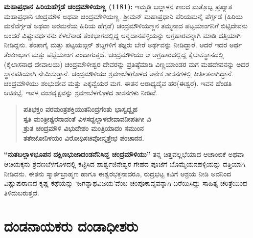 \textbf{ಮಹಾಪ್ರಧಾನ ಹಿರಿಯಹೆಗ್ಗಡೆ ಚಂದ್ರಮೌಳಿಯಣ್ಣ (1181):} ಇಮ್ಮಡಿ ಬಲ್ಲಾಳನ ಕಾಲದ ಮತ್ತೊಬ್ಬ ಪ್ರಖ್ಯಾತ ಮಹಾಪ್ರಧಾನಿ ಚಂದ್ರಮೌಳಿ ಅಥವಾ ಚಂದ್ರಮೌಳಿಯಣ್ಣ. ಶ‍್ರೀಮನ್​ ಮಹಾಪ್ರಧಾನಿ ಪೆರಿಯಮನೈ ಪೆರ್ಗ್ಗಡೆ (ಹಿರಿಯ ಮನೆವೆರ್ಗ್ಗಡೆ ಅಥವಾ ಅರಮನೆಯ ಹಿರಿಯ ಹೆಗ್ಗಡೆ) ಚಂದ್ರಮೌಳಿಯಣ್ಣನ ತಮ್ಮನಾದ ಪಟ್ಟಯಾಂಗನಿಗೆ ಬಿಟ್ಟಿದೇವನು ಅಂದರೆ ವಿಷ್ಣುವರ್ಧನನು ಕೆಳಲೆನಾಡ ತೆಂಕಭಾಗದಲ್ಲಿದ್ದ ಅನ್ನದಾನಪಳ್ಳಿಯನ್ನು ಅಗ್ರಹಾರವನ್ನಾಗಿ ಮಾಡಿ ದತ್ತಿಯಾಗಿ ನೀಡಿದ್ದನು. ತೆಂಪಾಗೈ ಮತ್ತು ಪಟ್ಟಯಙ್ಗನ್​ ಶಬ್ದಗಳಿಗೆ ತಜ್ಞರು ಬೇರೆ ಅರ್ಥವನ್ನು ನೀಡಿದ್ದಾರೆ. ಆದರೆ ಇದರ ಅರ್ಥ ತೆಂಕಣಭಾಗ ಮತ್ತು ಪಟ್ಟೆಯಾಂಗ ಎಂದಾಗುತ್ತದೆ. ಚಂದ್ರಮೌಳಿಯು ಆ ಅಗ್ರಹಾರದಲ್ಲಿದ್ದ ಕೈಲಾಸಸ್ಥಾನದಲ್ಲಿ (ಕೈಲಾಸನಾಥ ದೇವಾಲಯ) ಚಂದ್ರಮೌಳೀಶ್ವರ ದೇವರನ್ನು ಪ್ರತಿಷ್ಠೆಮಾಡಿ ವಿಣ್ಣಯಾಂಡರ ಮಗ ಮಹದೇವನನ್ನು ಅದರ ಸ್ಥಾನಪತಿಯಾಗಿ ನೇಮಿಸುತ್ತಾನೆ. ಚಂದ್ರಮೌಳಿಯು ಶ್ರವಣಬೆಳಗೊಳದ ಅನೇಕ ಶಾಸನಗಳಲ್ಲಿ ಕೀರ್ತಿತನಾಗಿದ್ದಾನೆ. ಚಂದ್ರಮೌಳಿಯು ಶಂಭುದೇವ ಮತ್ತು ಎಕ್ಕವ್ವೆಯರ ಮಗ. ಈತನ ಆರಾಧ್ಯದೈವ ಹರ(ಈಶ್ವರ). ಇವನ ಹೆಂಡತಿ ಆಚಿಕಬ್ಬೆ. ಇವಳ ವಂಶವೃಕ್ಷವನ್ನು ಶ್ರವಣಬೆಳಗೊಳದ ಶಾಸನಗಳು ನೀಡಿವೆ.

\begin{verse}
\textbf{ಪತಿಭಕ್ತಂ ವರಮಂತ್ರಶಕ್ತಿಯುತನಿಂದ್ರಗೆಂತು ಭಾಸ್ವದ್ಬೃಹ} \\\textbf{ಸ್ಪತಿ ಮಂತ್ರೀಶ್ವರನಾದಂತೆ ವಿಳಸದ್ಬಲ್ಲಾಳದೇವಾವನೀಪತಿಗೀ ವಿ} \\\textbf{ಶ್ರುತ ಚಂದ್ರಮೌಳಿ ವಿಭುದೇಶಂ ಮಂತ್ರಿಯಾದಂ ಸಮುಂನ} \\\textbf{ತತೇಜೋನಿಳಯಂ ವಿರೋಧಿಸಚಿವೋನ್ಮತ್ತೇಭ ಪಂಚಾನನ.}
\end{verse}

\textbf{“ನುತಬಲ್ಲಾಳಭೂಪನ ದಕ್ಷಿಣಭುಜಾದಂಡನೆನಿಸಿದ್ದ ಚಂದ್ರಮೌಳಿಯು”} ತನ್ನ ಚಿತ್ತವಲ್ಲಭೆಯಾದ ಆಚಾಂಬಿಕೆ ಅಥವಾ ಆಚಿಯಕ್ಕನು ಶ್ರವಣಬೆಳಗೊಳದಲ್ಲಿ ಕಟ್ಟಿಸಿದ ಪಾರ್ಶ್ವಜಿನೇಶ್ವರ ಗೇಹದ ಪೂಜೆಗೆ ಬೊಮ್ಮೆಯನಹಳ್ಳಿಯನ್ನು ದತ್ತಿಯಾಗಿ ನೀಡಿದನು. ಈತನು ಸ್ಮಾರ್ತಬ್ರಾಹ್ಮಣ ಹಾಗೂ ಈಶ್ವರಭಕ್ತನಾದರೂ, ರುದ್ರಭಟ್ಟ ಕವಿಗೆ ಆಶ್ರಯ ನೀಡಿ ಅವನಿಂದ ವಿಷ್ಣುಪುರಾಣದ ಕೃಷ್ಣ ಕಥೆಯನ್ನು ‘ಜಗನ್ನಾಥವಿಜಯ’ವೆಂಬ ಚಂಪೂಕಾವ್ಯವನ್ನಾಗಿ ಬರೆಯಿಸಿದ್ದು ಸಾಹಿತ್ಯ ಚರಿತ್ರೆಯಿಂದ ತಿಳಿದುಬರುತ್ತದೆ.


\section*{ದಂಡನಾಯಕರು \enginline{-} ದಂಡಾಧೀಶರು}

